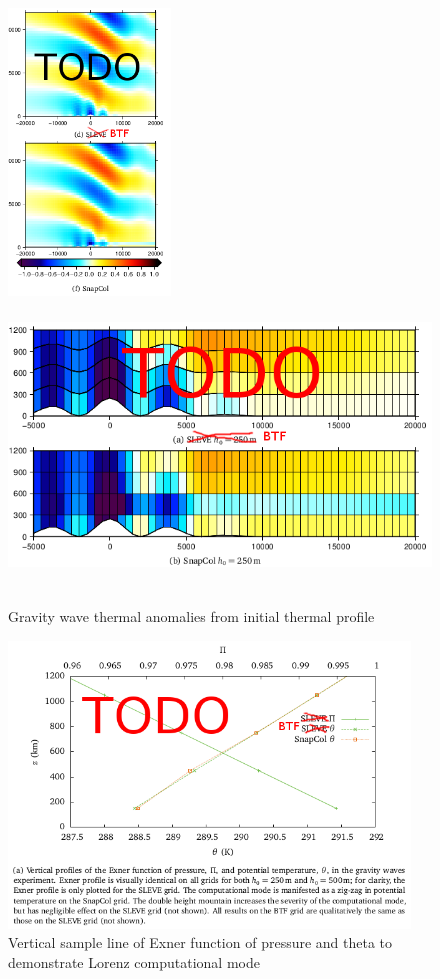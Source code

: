 \documentclass[a4paper]{article}
\begin{document}
\begin{figure}
	\includegraphics[height=3in]{gw-theta.png}
	\includegraphics[height=3in]{gw-theta-zoom.png}
%
	\caption{Gravity wave thermal anomalies from initial thermal profile}
	\label{fig:gw-theta}
\end{figure}

\begin{figure}
	\includegraphics[height=3in]{gw-exner-theta.png}
%
	\caption{Vertical sample line of Exner function of pressure and theta to demonstrate Lorenz computational mode}
	\label{fig:gw-exner-theta}
\end{figure}
\end{document}
